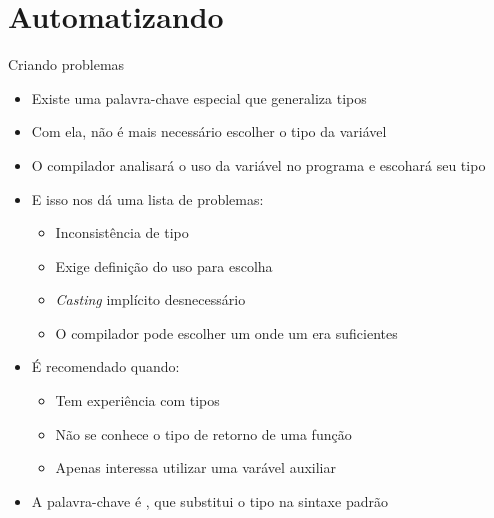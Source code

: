 \documentclass[14pt]{beamer}
\begin{document}
	\section{Automatizando}
		\begin{frame}{Criando problemas}
			\begin{itemize}
				\presentationPause\item Existe uma palavra-chave especial que generaliza tipos
				\presentationPause\item Com ela, não é mais necessário escolher o tipo da variável
				\presentationPause\item O compilador analisará o uso da variável no programa e escohará seu tipo
				\presentationPause\item E isso nos dá uma lista de problemas:
				\begin{itemize}
					\presentationPause\item Inconsistência de tipo
					\presentationPause\item Exige definição do uso para escolha
					\presentationPause\item \textit{Casting} implícito desnecessário
					\presentationPause\item O compilador pode escolher um  onde um  era suficientes
				\end{itemize}
				\presentationPause\item É recomendado quando:
				\begin{itemize}
					\presentationPause\item Tem experiência com tipos
					\presentationPause\item Não se conhece o tipo de retorno de uma função
					\presentationPause\item Apenas interessa utilizar uma varável auxiliar
				\end{itemize}
				\presentationPause\item A palavra-chave é , que substitui o tipo na sintaxe padrão
			\end{itemize}
		\end{frame}
\end{document}
